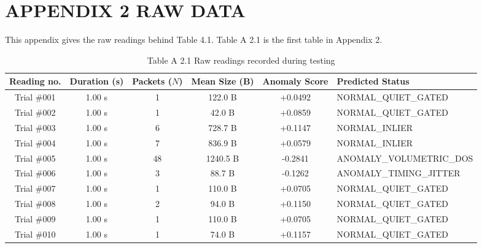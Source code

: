 \documentclass[11pt,a4paper]{report}
\begin{document}
\clearpage

\section*{APPENDIX 2 \quad RAW DATA}
\vspace{-4pt}
This appendix gives the raw readings behind Table 4.1. Table A 2.1 is the first table in Appendix 2.

\begin{table}[htbp]
\centering
\caption{Table A 2.1 Raw readings recorded during testing}\label{tab:raw_data}
\vspace{4pt}
{\scriptsize
\begin{tabular}{|c|c|c|c|c|l|}
\hline
\rowcolor{black!10}
\textbf{Reading no.} & \textbf{Duration (s)} & \textbf{Packets ($N$)} & \textbf{Mean Size (B)} & \textbf{Anomaly Score} & \textbf{Predicted Status} \\
\hline
Trial \#001 & 1.00 s & 1 & 122.0 B & +0.0492 & NORMAL\_QUIET\_GATED \\
\hline
Trial \#002 & 1.00 s & 1 & 42.0 B & +0.0859 & NORMAL\_QUIET\_GATED \\
\hline
Trial \#003 & 1.00 s & 6 & 728.7 B & +0.1147 & NORMAL\_INLIER \\
\hline
Trial \#004 & 1.00 s & 7 & 836.9 B & +0.0579 & NORMAL\_INLIER \\
\hline
Trial \#005 & 1.00 s & 48 & 1240.5 B & -0.2841 & ANOMALY\_VOLUMETRIC\_DOS \\
\hline
Trial \#006 & 1.00 s & 3 & 88.7 B & -0.1262 & ANOMALY\_TIMING\_JITTER \\
\hline
Trial \#007 & 1.00 s & 1 & 110.0 B & +0.0705 & NORMAL\_QUIET\_GATED \\
\hline
Trial \#008 & 1.00 s & 2 & 94.0 B & +0.1150 & NORMAL\_QUIET\_GATED \\
\hline
Trial \#009 & 1.00 s & 1 & 110.0 B & +0.0705 & NORMAL\_QUIET\_GATED \\
\hline
Trial \#010 & 1.00 s & 1 & 74.0 B & +0.1157 & NORMAL\_QUIET\_GATED \\
\hline
\end{tabular}
}
\end{table}

\vspace{0.4cm}

\end{document}
